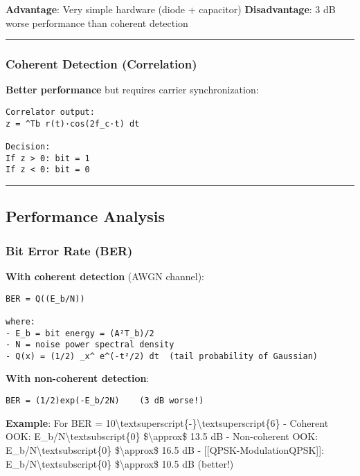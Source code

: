 \textbf{Advantage}: Very simple hardware (diode + capacitor)
\textbf{Disadvantage}: 3 dB worse performance than coherent detection

\begin{center}\rule{0.5\linewidth}{0.5pt}\end{center}

\subsubsection{Coherent Detection
(Correlation)}\label{coherent-detection-correlation}

\textbf{Better performance} but requires carrier synchronization:

\begin{verbatim}
Correlator output:
z = ^Tb r(t)·cos(2f_c·t) dt

Decision:
If z > 0: bit = 1
If z < 0: bit = 0
\end{verbatim}

\begin{center}\rule{0.5\linewidth}{0.5pt}\end{center}

\subsection{\texorpdfstring{ Performance
Analysis}{ Performance Analysis}}\label{performance-analysis}

\subsubsection{Bit Error Rate (BER)}\label{bit-error-rate-ber}

\textbf{With coherent detection} (AWGN channel):

\begin{verbatim}
BER = Q((E_b/N))

where:
- E_b = bit energy = (A²T_b)/2
- N = noise power spectral density
- Q(x) = (1/2) _x^ e^(-t²/2) dt  (tail probability of Gaussian)
\end{verbatim}

\textbf{With non-coherent detection}:

\begin{verbatim}
BER = (1/2)exp(-E_b/2N)    (3 dB worse!)
\end{verbatim}

\textbf{Example}: For BER =
10\textbackslash textsuperscript\{-\}\textbackslash textsuperscript\{6\}
- Coherent OOK: E\_b/N\textbackslash textsubscript\{0\}
\$\textbackslash approx\$ 13.5 dB - Non-coherent OOK:
E\_b/N\textbackslash textsubscript\{0\} \$\textbackslash approx\$ 16.5
dB - {[}{[}QPSK-Modulation\textbar QPSK{]}{]}:
E\_b/N\textbackslash textsubscript\{0\} \$\textbackslash approx\$ 10.5
dB (better!)

